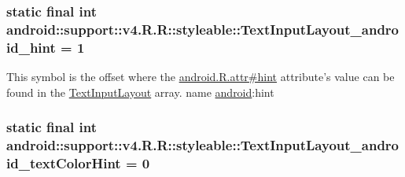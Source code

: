\hypertarget{classandroid_1_1support_1_1v4_1_1_r_1_1styleable_2296977f7a733d53ec47e700d4130151}{
\subsubsection[{TextInputLayout\_\-android\_\-hint}]{\setlength{\rightskip}{0pt plus 5cm}static final int android::support::v4.R.R::styleable::TextInputLayout\_\-android\_\-hint = 1}}
\label{classandroid_1_1support_1_1v4_1_1_r_1_1styleable_2296977f7a733d53ec47e700d4130151}


This symbol is the offset where the \hyperlink{}{android.R.attr\#hint} attribute's value can be found in the \hyperlink{classandroid_1_1support_1_1v4_1_1_r_1_1styleable_880beb171ce483ab1b63a82ef7f9d976}{TextInputLayout} array.  name \hyperlink{namespaceandroid}{android}:hint \hypertarget{classandroid_1_1support_1_1v4_1_1_r_1_1styleable_1e92f2247843ef875eda6c3045e73bbd}{
\subsubsection[{TextInputLayout\_\-android\_\-textColorHint}]{\setlength{\rightskip}{0pt plus 5cm}static final int android::support::v4.R.R::styleable::TextInputLayout\_\-android\_\-textColorHint = 0}}
\label{classandroid_1_1support_1_1v4_1_1_r_1_1styleable_1e92f2247843ef875eda6c3045e73bbd}


